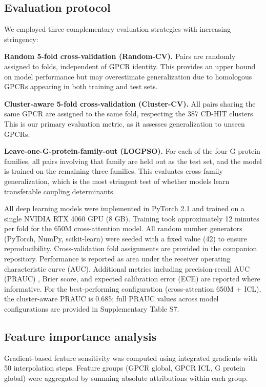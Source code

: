 \documentclass[11pt,a4paper]{article}
\begin{document}
\subsection{Evaluation protocol}

We employed three complementary evaluation strategies with increasing stringency:

\textbf{Random 5-fold cross-validation (Random-CV).} Pairs are randomly assigned to folds, independent of GPCR identity. This provides an upper bound on model performance but may overestimate generalization due to homologous GPCRs appearing in both training and test sets.

\textbf{Cluster-aware 5-fold cross-validation (Cluster-CV).} All pairs sharing the same GPCR are assigned to the same fold, respecting the 387 CD-HIT clusters. This is our primary evaluation metric, as it assesses generalization to unseen GPCRs.

\textbf{Leave-one-G-protein-family-out (LOGPSO).} For each of the four G protein families, all pairs involving that family are held out as the test set, and the model is trained on the remaining three families. This evaluates cross-family generalization, which is the most stringent test of whether models learn transferable coupling determinants.

All deep learning models were implemented in PyTorch 2.1 \cite{paszke2019pytorch} and trained on a single NVIDIA RTX 4060 GPU (8 GB). Training took approximately 12 minutes per fold for the 650M cross-attention model. All random number generators (PyTorch, NumPy, scikit-learn) were seeded with a fixed value (42) to ensure reproducibility. Cross-validation fold assignments are provided in the companion repository. Performance is reported as area under the receiver operating characteristic curve (AUC). Additional metrics including precision-recall AUC (PRAUC) \cite{davis2006calibration, saito2015prauc}, Brier score, and expected calibration error (ECE) are reported where informative. For the best-performing configuration (cross-attention 650M + ICL), the cluster-aware PRAUC is 0.685; full PRAUC values across model configurations are provided in Supplementary Table S7.

\subsection{Feature importance analysis}

Gradient-based feature sensitivity was computed using integrated gradients \cite{sundararajan2017axiomatic} with 50 interpolation steps. Feature groups (GPCR global, GPCR ICL, G protein global) were aggregated by summing absolute attributions within each group.
\end{document}
